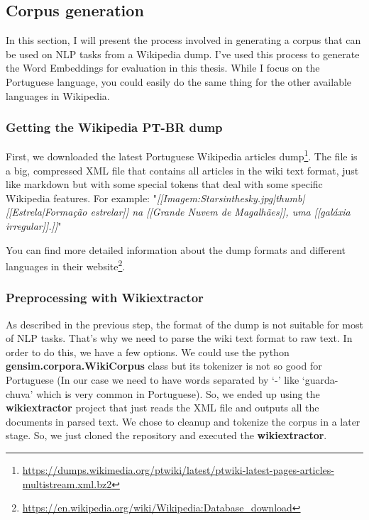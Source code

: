 \subsection{Corpus generation}\label{chap:methodsandmaterials:corpus}

In this section, I will present the process involved in generating a corpus that can be used on NLP tasks from a Wikipedia dump. I’ve used this process to generate the Word Embeddings for evaluation in this thesis. While I focus on the Portuguese language, you could easily do the same thing for the other available languages in Wikipedia.

\subsubsection{Getting the Wikipedia PT-BR dump}

First, we downloaded the latest Portuguese Wikipedia articles dump\footnote{\url{https://dumps.wikimedia.org/ptwiki/latest/ptwiki-latest-pages-articles-multistream.xml.bz2}}. The file is a big, compressed XML file that contains all articles in the wiki text format, just like markdown but with some special tokens that deal with some specific Wikipedia features. For example: "\textit{[[Imagem:Starsinthesky.jpg|thumb|[[Estrela|Formação estrelar]] na [[Grande Nuvem de Magalhães]], uma [[galáxia irregular]].]]}"


You can find more detailed information about the dump formats and different languages in their website\footnote{\url{https://en.wikipedia.org/wiki/Wikipedia:Database_download}}.

\subsubsection{Preprocessing with Wikiextractor}

As described in the previous step, the format of the dump is not suitable for most of NLP tasks. That’s why we need to parse the wiki text format to raw text. In order to do this, we have a few options. We could use the python \textbf{gensim.corpora.WikiCorpus} class but its tokenizer is not so good for Portuguese (In our case we need to have words separated by ‘-’ like ‘guarda-chuva’ which is very common in Portuguese). So, we ended up using the \textbf{wikiextractor} project that just reads the XML file and outputs all the documents in parsed text. We chose to cleanup and tokenize the corpus in a later stage. So, we just cloned the repository and executed the \textbf{wikiextractor}.

